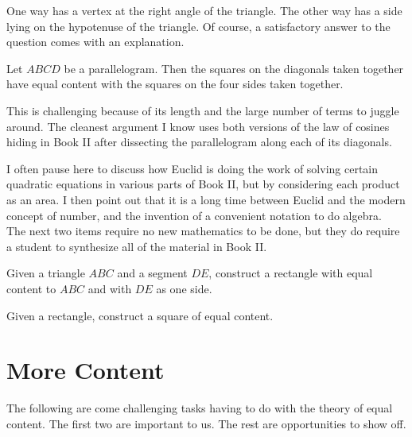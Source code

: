 \begin{annotation}
{
\color{blue}
One way has a vertex at the right angle of the triangle. The other way has a side lying on the hypotenuse of the triangle. Of course, a satisfactory answer to the question comes with an explanation.
}
\end{annotation}

\begin{conjecture}\label{conj:parallelogram-law}
Let $ABCD$ be a parallelogram. Then the squares on the diagonals taken together have equal content with the squares on the four sides taken together.
\end{conjecture}

\begin{annotation}
{
\color{blue}
This is challenging because of its length and the large number of terms to juggle around. The cleanest argument I know uses both versions of the law of cosines hiding in Book II after dissecting the parallelogram along each of its diagonals.

I often pause here to discuss how Euclid is doing the work of solving certain quadratic equations in various parts of Book II, but by considering each product as an area. I then point out that it is a long time between Euclid and the modern concept of number, and the invention of a convenient notation to do algebra.\\


The next two items require no new mathematics to be done, but they do require a student to synthesize all of the material in Book II. 
}
\end{annotation}

\begin{problem}\label{prob:rectify-triangle}
Given a triangle $ABC$ and a segment $DE$, construct a rectangle with equal content to $ABC$ and with $DE$ as one side.
\end{problem}

\begin{problem}\label{prob:quadrature-of-rectangle}
Given a rectangle, construct a square of equal content.
\end{problem}




\chapter{More Content}

The following are come challenging tasks having to do with the theory of equal content.
The first two are important to us.
The rest are opportunities to show off.

